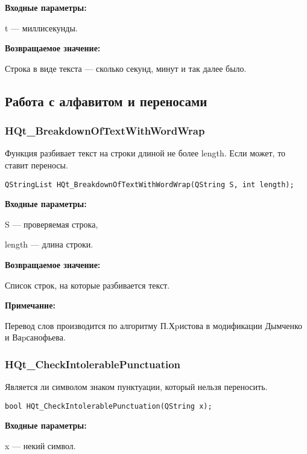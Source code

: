 \documentclass[a4paper,12pt]{article}
\begin{document}
\textbf{Входные параметры:}

t --- миллисекунды.

\textbf{Возвращаемое значение:}

Строка в виде текста --- сколько секунд, минут и так далее было.


\subsection{Работа с алфавитом и переносами}

\subsubsection{HQt\_BreakdownOfTextWithWordWrap}\label{HQt_BreakdownOfTextWithWordWrap}

Функция разбивает текст на строки длиной не более length. Если может, то ставит переносы.


\begin{lstlisting}[label=code_syntax_HQt_BreakdownOfTextWithWordWrap,caption=Синтаксис]
QStringList HQt_BreakdownOfTextWithWordWrap(QString S, int length);
\end{lstlisting}

\textbf{Входные параметры:}

S --- проверяемая строка,

length ---  длина строки.

\textbf{Возвращаемое значение:}
 
Список строк, на которые разбивается текст.

\textbf{Примечание:}

Перевод слов производится по алгоритму П.Хpистова в модификации Дымченко и Ваpсанофьева.


\subsubsection{HQt\_CheckIntolerablePunctuation}\label{HQt_CheckIntolerablePunctuation}

Является ли символом знаком пунктуации, который нельзя переносить.


\begin{lstlisting}[label=code_syntax_HQt_CheckIntolerablePunctuation,caption=Синтаксис]
bool HQt_CheckIntolerablePunctuation(QString x);
\end{lstlisting}

\textbf{Входные параметры:}

x --- некий символ.
\end{document}
